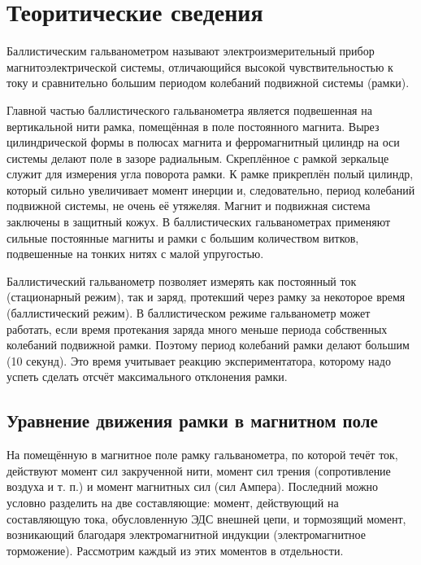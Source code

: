 \section{Теоритические сведения}
Баллистическим гальванометром называют электроизмерительный прибор магнитоэлектрической системы, отличающийся высокой чувствительностью к току и сравнительно большим периодом колебаний подвижной системы (рамки).

Главной частью баллистического гальванометра является подвешенная на вертикальной
нити рамка, помещённая в поле постоянного
магнита. Вырез цилиндрической формы в полюсах магнита и ферромагнитный цилиндр на
оси системы делают поле в зазоре радиальным.
Скреплённое с рамкой зеркальце служит для измерения угла поворота рамки. К рамке прикреплён полый цилиндр, который сильно увеличивает момент инерции и,
следовательно, период колебаний подвижной системы, не очень её утяжеляя. Магнит и подвижная система заключены в защитный кожух. В баллистических гальванометрах применяют сильные постоянные магниты и рамки с большим количеством
витков, подвешенные на тонких нитях с малой упругостью.

\begin{figure}[ht!]
\end{figure}

Баллистический гальванометр позволяет измерять как постоянный
ток (стационарный режим), так и заряд, протекший через рамку за
некоторое время (баллистический режим). В баллистическом режиме
гальванометр может работать, если время протекания заряда много
меньше периода собственных колебаний подвижной рамки. Поэтому период колебаний рамки делают большим (10 секунд). Это время учитывает реакцию экспериментатора, которому надо успеть сделать отсчёт максимального отклонения рамки.

\subsection{Уравнение движения рамки в магнитном поле}
На помещённую в магнитное поле рамку гальванометра, по которой
течёт ток, действуют момент сил закрученной нити, момент сил трения
(сопротивление воздуха и т. п.) и момент магнитных сил (сил Ампера).
Последний можно условно разделить на две составляющие: момент, действующий на составляющую тока, обусловленную ЭДС внешней цепи,
и тормозящий момент, возникающий благодаря электромагнитной индукции (электромагнитное торможение). Рассмотрим каждый из этих
моментов в отдельности.

